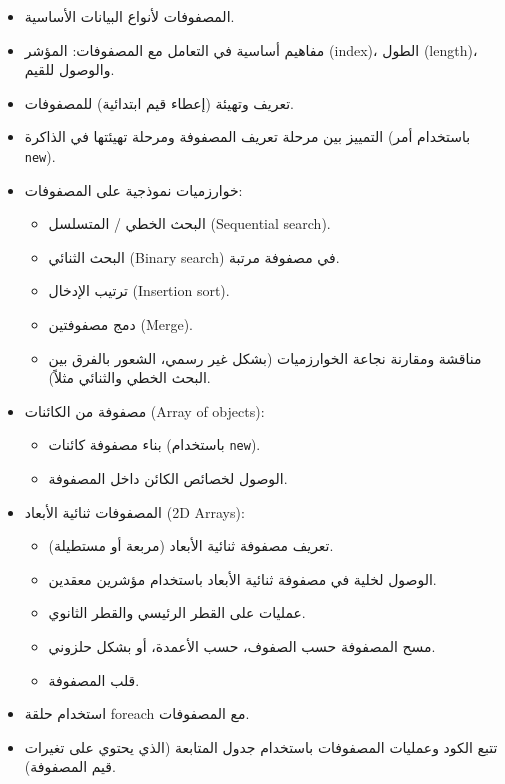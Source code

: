 ﻿\documentclass[14pt]{extarticle}
\begin{document}
\begin{itemize}
    \item المصفوفات لأنواع البيانات الأساسية.
    \item مفاهيم أساسية في التعامل مع المصفوفات: المؤشر (\textenglish{index})، الطول (\textenglish{length})، والوصول للقيم.
    \item تعريف وتهيئة (إعطاء قيم ابتدائية) للمصفوفات.
    \item التمييز بين مرحلة تعريف المصفوفة ومرحلة تهيئتها في الذاكرة (باستخدام أمر \texttt{new}).
    \item خوارزميات نموذجية على المصفوفات:
    \begin{itemize}
        \item البحث الخطي / المتسلسل (\textenglish{Sequential search}).
        \item البحث الثنائي (\textenglish{Binary search}) في مصفوفة مرتبة.
        \item ترتيب الإدخال (\textenglish{Insertion sort}).
        \item دمج مصفوفتين (\textenglish{Merge}).
        \item مناقشة ومقارنة نجاعة الخوارزميات (بشكل غير رسمي، الشعور بالفرق بين البحث الخطي والثنائي مثلاً).
    \end{itemize}
    \item مصفوفة من الكائنات (\textenglish{Array of objects}):
    \begin{itemize}
        \item بناء مصفوفة كائنات (باستخدام \texttt{new}).
        \item الوصول لخصائص الكائن داخل المصفوفة.
    \end{itemize}
    \item المصفوفات ثنائية الأبعاد (\textenglish{2D Arrays}):
    \begin{itemize}
        \item تعريف مصفوفة ثنائية الأبعاد (مربعة أو مستطيلة).
        \item الوصول لخلية في مصفوفة ثنائية الأبعاد باستخدام مؤشرين معقدين.
        \item عمليات على القطر الرئيسي والقطر الثانوي.
        \item مسح المصفوفة حسب الصفوف، حسب الأعمدة، أو بشكل حلزوني.
        \item قلب المصفوفة.
    \end{itemize}
    \item استخدام حلقة \textenglish{foreach} مع المصفوفات.
    \item تتبع الكود وعمليات المصفوفات باستخدام جدول المتابعة (الذي يحتوي على تغيرات قيم المصفوفة).
\end{itemize}
\end{document}
